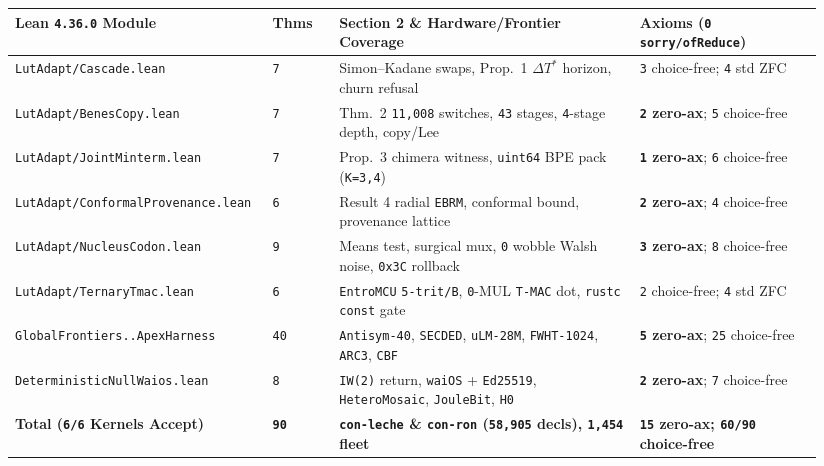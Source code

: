 \documentclass[10pt]{article}
\begin{document}
{\footnotesize\setlength{\tabcolsep}{3pt}
\begin{longtable}{@{}L{0.28\linewidth}C{0.08\linewidth}L{0.36\linewidth}L{0.22\linewidth}@{}}
\toprule
\textbf{Lean \texttt{4.36.0} Module} & \textbf{Thms} & \textbf{Section 2 \& Hardware/Frontier Coverage} & \textbf{Axioms (\texttt{0 sorry/ofReduce})} \\
\midrule
\endhead
\texttt{LutAdapt/Cascade.lean} & \texttt{7} & Simon--Kadane swaps, Prop.\ 1 $\Delta T^*$ horizon, churn refusal & \texttt{3} choice-free; \texttt{4} std ZFC \\
\texttt{LutAdapt/BenesCopy.lean} & \texttt{7} & Thm.\ 2 \texttt{11,008} switches, \texttt{43} stages, \texttt{4}-stage depth, copy/Lee & \textbf{\texttt{2} zero-ax}; \texttt{5} choice-free \\
\texttt{LutAdapt/JointMinterm.lean} & \texttt{7} & Prop.\ 3 chimera witness, \texttt{uint64} BPE pack (\texttt{K=3,4}) & \textbf{\texttt{1} zero-ax}; \texttt{6} choice-free \\
\texttt{LutAdapt/ConformalProvenance.lean} & \texttt{6} & Result 4 radial \texttt{EBRM}, conformal bound, provenance lattice & \textbf{\texttt{2} zero-ax}; \texttt{4} choice-free \\
\texttt{LutAdapt/NucleusCodon.lean} & \texttt{9} & Means test, surgical mux, \texttt{0} wobble Walsh noise, \texttt{0x3C} rollback & \textbf{\texttt{3} zero-ax}; \texttt{8} choice-free \\
\texttt{LutAdapt/TernaryTmac.lean} & \texttt{6} & \texttt{EntroMCU} \texttt{5-trit/B}, \texttt{0}-MUL \texttt{T-MAC} dot, \texttt{rustc const} gate & \texttt{2} choice-free; \texttt{4} std ZFC \\
\texttt{GlobalFrontiers..ApexHarness} & \texttt{40} & \texttt{Antisym-40}, \texttt{SECDED}, \texttt{uLM-28M}, \texttt{FWHT-1024}, \texttt{ARC3}, \texttt{CBF} & \textbf{\texttt{5} zero-ax}; \texttt{25} choice-free \\
\texttt{DeterministicNullWaios.lean} & \texttt{8} & \texttt{IW(2)} return, \texttt{waiOS} + \texttt{Ed25519}, \texttt{HeteroMosaic}, \texttt{JouleBit}, \texttt{H0} & \textbf{\texttt{2} zero-ax}; \texttt{7} choice-free \\
\midrule
\textbf{Total (\texttt{6/6} Kernels Accept)} & \textbf{\texttt{90}} & \textbf{\texttt{con-leche} \& \texttt{con-ron} (\texttt{58,905} decls), \texttt{1,454} fleet} & \textbf{\texttt{15} zero-ax; \texttt{60/90} choice-free} \\
\bottomrule
\end{longtable}
}
\end{document}
